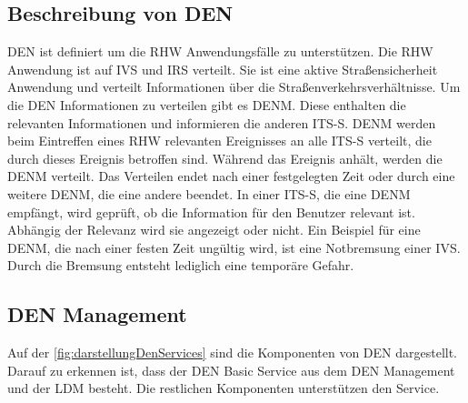 \subsection{Beschreibung von DEN \label{facilityLayer_beschreibungDEN}}
\ac{DEN} ist definiert um die \ac{RHW} Anwendungsfälle zu unterstützen.	Die \ac{RHW} Anwendung ist auf \ac{IVS} und \ac{IRS} verteilt. Sie ist eine aktive Straßensicherheit Anwendung und verteilt Informationen über die Straßenverkehrsverhältnisse. Um die \ac{DEN} Informationen zu verteilen gibt es \ac{DENM}. Diese enthalten die relevanten Informationen und informieren die anderen \ac{ITS-S}. \ac{DENM} werden beim Eintreffen eines \ac{RHW} relevanten Ereignisses an alle \ac{ITS-S} verteilt, die durch dieses Ereignis betroffen sind. Während das Ereignis anhält, werden die \ac{DENM} verteilt. Das Verteilen endet nach einer festgelegten Zeit oder durch eine weitere \ac{DENM}, die eine andere beendet. In einer \ac{ITS-S}, die eine \ac{DENM} empfängt, wird geprüft, ob die Information für den Benutzer relevant ist. Abhängig der Relevanz wird sie angezeigt oder nicht. Ein Beispiel für eine \ac{DENM}, die nach einer festen Zeit ungültig wird, ist eine Notbremsung einer \ac{IVS}. Durch die Bremsung entsteht lediglich eine temporäre Gefahr. 


\subsection{DEN Management}
Auf der \autoref{fig:darstellungDenServices} sind die Komponenten von \ac{DEN} dargestellt. Darauf zu erkennen ist, dass der \ac{DEN} Basic Service aus dem \ac{DEN} Management und der \ac{LDM} besteht. Die restlichen Komponenten unterstützen den Service. 

